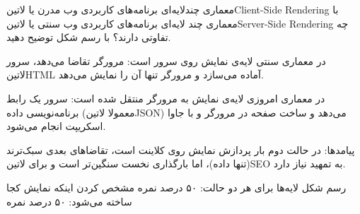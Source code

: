 
معماری چند‌لایه‌ای برنامه‌های کاربردی وب مدرن یا ‌لاتین{Client-Side Rendering}
با معماری چند لایه‌ای برنامه‌های کاربردی وب سنتی یا ‌لاتین{Server-Side Rendering}
چه تفاوتی دارند؟ با رسم شکل توضیح دهید.


\begin{پاسخ}

در معماری سنتی لایه‌ی نمایش روی سرور است:
مرورگر تقاضا می‌دهد، سرور ‌لاتین{HTML} آماده می‌سازد و مرورگر تنها آن را نمایش می‌دهد.

در معماری امروزی لایه‌ی نمایش به مرورگر منتقل شده است:
سرور یک رابط برنامه‌نویسی داده (معمولا ‌لاتین{JSON}) می‌دهد و ساخت صفحه در مرورگر و با جاوا اسکریپت انجام می‌شود.

پیامدها: در حالت دوم بار پردازش نمایش روی کلاینت است، تقاضاهای بعدی سبک‌ترند (تنها داده)،
اما بارگذاری نخست سنگین‌تر است و برای ‌لاتین{SEO} به تمهید نیاز دارد.

 رسم شکل لایه‌ها برای هر دو حالت: ۵۰ درصد نمره
 مشخص کردن اینکه نمایش کجا ساخته می‌شود: ۵۰ درصد نمره

\end{پاسخ}

